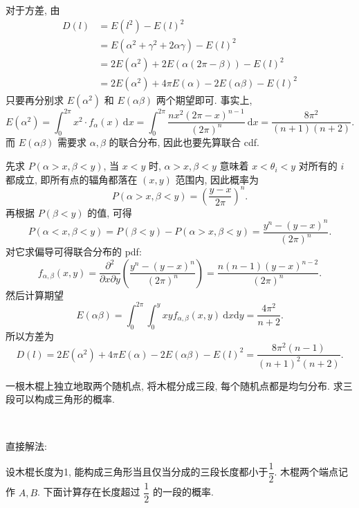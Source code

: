 对于方差, 由 
\begin{align*}
D(l) &= E(l^2) - E(l)^2 \\
&= E(\alpha^2 + \gamma^2 + 2\alpha\gamma) - E(l)^2 \\
&= 2E(\alpha^2) + 2E(\alpha(2\pi-\beta)) - E(l)^2 \\
&= 2E(\alpha^2) + 4\pi E(\alpha) - 2E(\alpha\beta) - E(l)^2
\end{align*}
只要再分别求 $E(\alpha^2)$ 和 $E(\alpha\beta)$ 两个期望即可. 事实上,
\[E(\alpha^2) = \int_0^{2\pi} x^2\cdot f_\alpha(x)\ \mathrm{d}x = \int_0^{2\pi} \frac{nx^2(2\pi-x)^{n-1}}{(2\pi)^{n}}\ \mathrm{d}x = \frac{8\pi^2}{(n+1)(n+2)} .\]
而 $E(\alpha\beta)$ 需要求 $\alpha,\beta$ 的联合分布, 因此也要先算联合 cdf. 

先求 $P(\alpha > x, \beta < y)$, 当 $x < y$ 时, $\alpha > x, \beta < y$ 意味着 $x < \theta_i < y$ 对所有的 $i$ 都成立, 即所有点的辐角都落在 $(x,y)$ 范围内, 因此概率为 
\[P(\alpha > x, \beta < y) = \left(\frac{y-x}{2\pi}\right)^n .\]
再根据 $P(\beta < y)$ 的值, 可得
\[P(\alpha < x, \beta < y) = P(\beta < y) - P(\alpha > x, \beta < y) = \frac{y^n - (y-x)^n}{(2\pi)^n} . \]
对它求偏导可得联合分布的 pdf:
\[f_{\alpha,\beta}(x,y) = \frac{\partial^2}{\partial x\partial y}\left(\frac{y^n - (y-x)^n}{(2\pi)^n}\right) = \frac{n(n-1)(y-x)^{n-2}}{(2\pi)^n} .\]
然后计算期望
\[E(\alpha\beta) = \int_0^{2\pi}\int_0^y xyf_{\alpha,\beta}(x,y)\ \mathrm{d}x\mathrm{d}y = \frac{4\pi^2}{n+2} .\]
所以方差为
\[D(l) = 2E(\alpha^2) + 4\pi E(\alpha) - 2E(\alpha\beta) - E(l)^2 = \frac{8\pi^2(n-1)}{(n+1)^2(n+2)} .\]

\newpage
一根木棍上独立地取两个随机点, 将木棍分成三段, 每个随机点都是均匀分布. 求三段可以构成三角形的概率.

~

\noindent 直接解法: 

设木棍长度为1, 能构成三角形当且仅当分成的三段长度都小于$\dfrac{1}{2}$. 木棍两个端点记作 $A,B$. 下面计算存在长度超过 $\dfrac{1}{2}$ 的一段的概率.
\begin{figure*}[htbp]
\centering
{}
\end{figure*}

